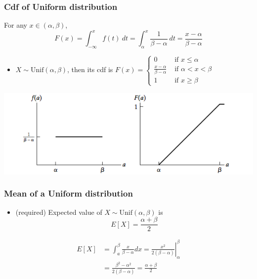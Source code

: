 \documentclass[slidestop,compress,mathserif]{beamer}
\begin{document}
\begin{frame}\frametitle{Cdf of Uniform distribution}
For any $x \in (\alpha, \beta)$,
\[
F(x) = \int_{-\infty}^x f(t)~dt
       = \int_{\alpha}^x \frac{1}{\beta-\alpha}~dt
       = \frac{x-\alpha}{\beta-\alpha}
\]

\pause %
\begin{itemize}
\item $X \sim \text{Unif}(\alpha, \beta)$, then its cdf is
$
F(x) =
\begin{cases}
0 & \text{ if } x \leq \alpha\\
\frac{x-\alpha}{\beta-\alpha} & \text{ if } \alpha < x < \beta\\
1 & \text{ if } x \geq \beta
\end{cases}
$
\end{itemize}

\pause
\begin{center}
\includegraphics[scale = 0.55]{figures/uniform}
\end{center}



\end{frame}


\begin{frame}\frametitle{Mean of a Uniform distribution}
\begin{itemize}
\item ({\color{red}required}) Expected value of $X\sim \text{Unif}(\alpha, \beta)$ is
\[ E[X]   = \frac{\alpha + \beta}{2} \]
\end{itemize}

\pause
\begin{align*}
E[X]   &= \int_a^\beta \frac{x}{\beta-\alpha} dx
        = \left. \frac{x^2}{2(\beta-\alpha)} \right|_\alpha^\beta \\
       &= \frac{\beta^2-\alpha^2}{2(\beta-\alpha)} = \frac{\alpha + \beta}{2} \\ \\
\end{align*}




\end{frame}
\end{document}
